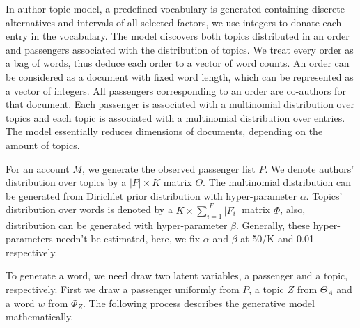 \documentclass{llncs}
\begin{document}
In author-topic model\cite{deiv:corpora}, a predefined vocabulary is generated containing discrete alternatives and intervals of all selected factors, we use integers to donate each entry in the vocabulary. The model discovers both topics distributed in an order and passengers associated with the distribution of topics. We treat every order as a bag of words, thus deduce each order to a vector of word counts. An order can be considered as a document with fixed word length, which can be represented as a vector of integers. All passengers corresponding to an order are co-authors for that document. Each passenger is associated with a multinomial distribution over topics and each topic is associated with a multinomial distribution over entries. The model essentially reduces dimensions of documents, depending on the amount of topics.\par

For an account $M$, we generate the observed passenger list $P$. We denote authors' distribution over topics by a $|P| \times K$ matrix $\Theta$. The multinomial distribution can be generated from Dirichlet prior distribution with hyper-parameter $\alpha$. Topics' distribution over words is denoted by a $K \times \sum_{i=1}^{|F|}|F_i| $  matrix $\Phi$, also, distribution can be generated with hyper-parameter $\beta$. Generally, these hyper-parameters needn't be estimated, here, we fix $\alpha$ and $\beta$ at 50/K and 0.01 respectively. \par

To generate a word, we need draw two latent variables,  a passenger and a topic, respectively. First we draw a passenger uniformly from $P$,  a topic $Z$ from $\Theta_A$ and a word $w$ from $\Phi_Z$. The following process describes the generative model mathematically.\par
\end{document}
